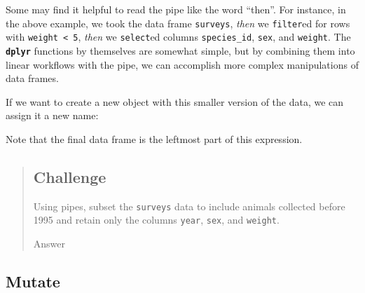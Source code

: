 \documentclass[]{book}
\newenvironment{Shaded}{\begin{snugshade}}{\end{snugshade}}
\newcommand{\KeywordTok}[1]{\textcolor[rgb]{0.13,0.29,0.53}{\textbf{#1}}}
\newcommand{\DecValTok}[1]{\textcolor[rgb]{0.00,0.00,0.81}{#1}}
\newcommand{\StringTok}[1]{\textcolor[rgb]{0.31,0.60,0.02}{#1}}
\newcommand{\OperatorTok}[1]{\textcolor[rgb]{0.81,0.36,0.00}{\textbf{#1}}}
\newcommand{\NormalTok}[1]{#1}
\begin{document}
Some may find it helpful to read the pipe like the word ``then''. For
instance, in the above example, we took the data frame \texttt{surveys},
\emph{then} we \texttt{filter}ed for rows with
\texttt{weight\ \textless{}\ 5}, \emph{then} we \texttt{select}ed
columns \texttt{species\_id}, \texttt{sex}, and \texttt{weight}. The
\textbf{\texttt{dplyr}} functions by themselves are somewhat simple, but
by combining them into linear workflows with the pipe, we can accomplish
more complex manipulations of data frames.

If we want to create a new object with this smaller version of the data,
we can assign it a new name:

\begin{Shaded}
\end{Shaded}

Note that the final data frame is the leftmost part of this expression.

\begin{quote}
\subsection{Challenge}\label{challenge-4}

Using pipes, subset the \texttt{surveys} data to include animals
collected before 1995 and retain only the columns \texttt{year},
\texttt{sex}, and \texttt{weight}.

Answer

\begin{Shaded}
\end{Shaded}
\end{quote}

\subsection{Mutate}\label{mutate}
\end{document}
